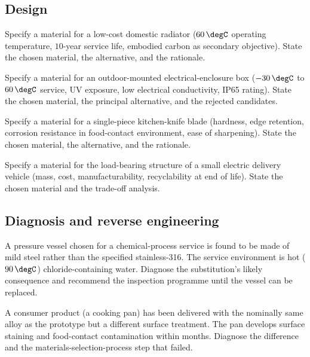 \subsection*{Design}

\begin{exercise}
Specify a material for a low-cost domestic radiator ($60\,\degC$
operating temperature, $10$-year service life, embodied carbon as
secondary objective). State the chosen material, the alternative, and
the rationale.
\end{exercise}

\begin{exercise}
Specify a material for an outdoor-mounted electrical-enclosure box
($-30\,\degC$ to $60\,\degC$ service, UV exposure, low electrical
conductivity, IP65 rating). State the chosen material, the principal
alternative, and the rejected candidates.
\end{exercise}

\begin{exercise}
Specify a material for a single-piece kitchen-knife blade
(hardness, edge retention, corrosion resistance in food-contact
environment, ease of sharpening). State the chosen material, the
alternative, and the rationale.
\end{exercise}

\begin{exercise}
Specify a material for the load-bearing structure of a small electric
delivery vehicle (mass, cost, manufacturability, recyclability at
end of life). State the chosen material and the trade-off analysis.
\end{exercise}

\subsection*{Diagnosis and reverse engineering}

\begin{exercise}
A pressure vessel chosen for a chemical-process service is found to
be made of mild steel rather than the specified stainless-316. The
service environment is hot ($90\,\degC$) chloride-containing water.
Diagnose the substitution's likely consequence and recommend the
inspection programme until the vessel can be replaced.
\end{exercise}

\begin{exercise}
A consumer product (a cooking pan) has been delivered with the
nominally same alloy as the prototype but a different surface
treatment. The pan develops surface staining and food-contact
contamination within months. Diagnose the difference and the
materials-selection-process step that failed.
\end{exercise}

